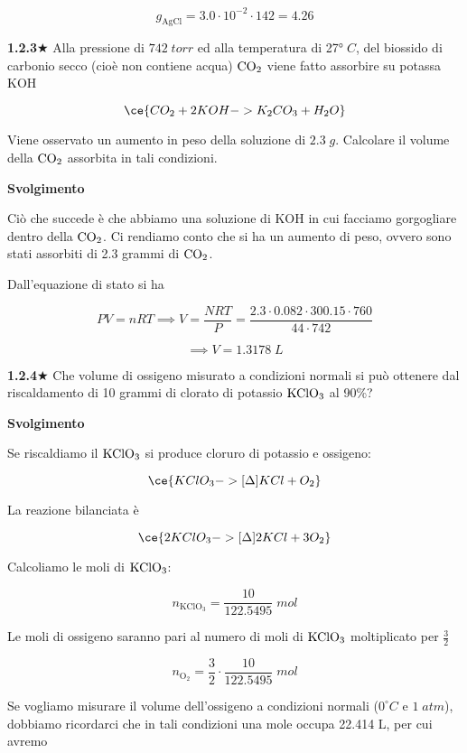 $$g_{\text{AgCl}}=3.0 \cdot 10^{-2} \cdot 142=4.26$$

\vspace{0.2cm}\textbf{1.2.3}$\bigstar$ Alla pressione di $742\;torr$ ed alla temperatura di 27°$\;C$, del biossido di carbonio secco (cioè non contiene acqua) $\rm CO_2$ viene fatto assorbire su potassa KOH 

$$\ce{CO_2 + 2KOH -> K_2CO_3 + H_2O}$$

Viene osservato un aumento in peso della soluzione di $2.3\;g$. Calcolare il volume della $\rm CO_2$ assorbita in tali condizioni.

\vspace{0.2cm}\large\textbf{Svolgimento}\normalsize

\vspace{0.2cm}Ciò che succede è che abbiamo una soluzione di KOH in cui facciamo gorgogliare dentro della $\rm CO_2$. Ci rendiamo conto che si ha un aumento di peso, ovvero sono stati assorbiti di 2.3 grammi di $\rm CO_2$.

Dall'equazione di stato si ha

$$PV=nRT
\implies
V=\frac{NRT}{P}=\frac{2.3 \cdot 0.082 \cdot 300.15 \cdot 760}{44 \cdot 742}$$

$$\implies V=1.3178\;L$$

\vspace{0.2cm}\textbf{1.2.4}$\bigstar$ Che volume di ossigeno misurato a condizioni normali si può ottenere dal riscaldamento di 10 grammi di clorato di potassio $\rm KClO_3$ al 90\%?

\vspace{0.2cm}\large\textbf{Svolgimento}\normalsize

\vspace{0.2cm}Se riscaldiamo il $\rm KClO_3$ si produce cloruro di potassio e ossigeno:

$$\ce{KClO_3 ->[{\Delta}] KCl + O_2}$$

La reazione bilanciata è

$$\ce{2KClO_3 ->[{\Delta}] 2KCl + 3O_2}$$

Calcoliamo le moli di $\rm KClO_3$:

$$n_{\text{KClO}_3}=\frac{10}{122.5495}\;mol$$

Le moli di ossigeno saranno pari al numero di moli di $\rm KClO_3$ moltiplicato per $\frac{3}{2}$

$$n_{\text{O}_2}=\frac{3}{2}\cdot\frac{10}{122.5495}\;mol$$

Se vogliamo misurare il volume dell'ossigeno a condizioni normali ($0^{\circ}C$ e $1\;atm$), dobbiamo ricordarci che in tali condizioni una mole occupa 22.414 L, per cui avremo

